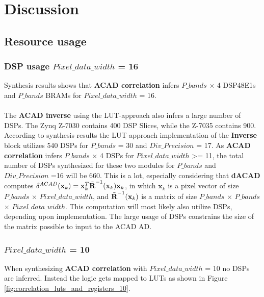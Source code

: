\chapter{Discussion}
\label{sec:Discussion}

\section{Resource usage}
\subsection{DSP usage $Pixel\_data\_width$ = 16}
Synthesis results shows that \textbf{ACAD correlation} infers $P\_bands$ $\times$ 4 DSP48E1s and $P\_bands$ BRAMs for $Pixel\_data\_width$ = 16. \\


\\
The \textbf{ACAD inverse} using the LUT-approach also infers a large number of DSPs. The Zynq Z-7030 contains 400 DSP Slices, while the Z-7035 contains 900. According to synthesis results the LUT-approach implementation of the \textbf{Inverse} block utilizes 540 DSPs for $P\_bands$ = 30 and $Div\_Precision$ = 17. As \textbf{ACAD correlation} infers $P\_bands$ $\times$ 4 DSPs for $Pixel\_data\_width$ >= 11, the total number of DSPs synthesized for these two modules for $P\_bands$ and $Div\_Precision$ =16 will be 660. This is a lot, especially considering that \textbf{dACAD} computes $\delta^{ACAD}(\textbf{x}_k)= \textbf{x}_k^T\Tilde{\textbf{R}}^{-1}(\textbf{x}_k)\textbf{x}_k$, in which $\textbf{x}_k$ is a pixel vector of size $P\_bands$ $\times$ $Pixel\_data\_width$, and $\Tilde{\textbf{R}}^{-1}(\textbf{x}_k)$ is a matrix of size $P\_bands$ $\times$ $P\_bands$ $\times$ $Pixel\_data\_width$. This computation will most likely also utilize DSPs, depending upon implementation.  
The large usage of DSPs constrains the size of the matrix possible to input to the ACAD AD. %
\subsection{$Pixel\_data\_width$ = 10}
When synthesizing \textbf{ACAD correlation} with $Pixel\_data\_width$ = 10 no DSPs are inferred. Instead the logic gets mapped to LUTs as shown in Figure \ref{fig:correlation_luts_and_registers_10}. 


